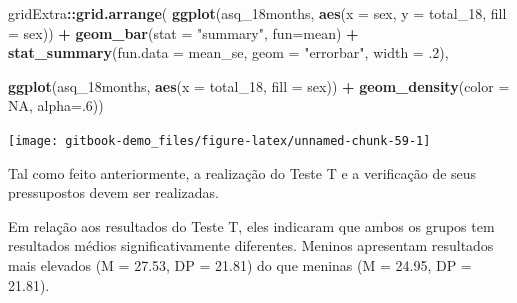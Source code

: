 \documentclass[
]{book}
\newenvironment{Shaded}{\begin{snugshade}}{\end{snugshade}}
\newcommand{\DataTypeTok}[1]{\textcolor[rgb]{0.13,0.29,0.53}{#1}}
\newcommand{\DecValTok}[1]{\textcolor[rgb]{0.00,0.00,0.81}{#1}}
\newcommand{\FloatTok}[1]{\textcolor[rgb]{0.00,0.00,0.81}{#1}}
\newcommand{\KeywordTok}[1]{\textcolor[rgb]{0.13,0.29,0.53}{\textbf{#1}}}
\newcommand{\NormalTok}[1]{#1}
\newcommand{\OperatorTok}[1]{\textcolor[rgb]{0.81,0.36,0.00}{\textbf{#1}}}
\newcommand{\OtherTok}[1]{\textcolor[rgb]{0.56,0.35,0.01}{#1}}
\newcommand{\StringTok}[1]{\textcolor[rgb]{0.31,0.60,0.02}{#1}}
\begin{document}
\begin{Shaded}
\begin{Highlighting}[]
\NormalTok{gridExtra}\OperatorTok{::}\KeywordTok{grid.arrange}\NormalTok{(}
  \KeywordTok{ggplot}\NormalTok{(asq_18months, }\KeywordTok{aes}\NormalTok{(}\DataTypeTok{x =}\NormalTok{ sex, }\DataTypeTok{y =}\NormalTok{ total_}\DecValTok{18}\NormalTok{, }\DataTypeTok{fill =}\NormalTok{ sex)) }\OperatorTok{+}
\StringTok{  }\KeywordTok{geom_bar}\NormalTok{(}\DataTypeTok{stat =} \StringTok{"summary"}\NormalTok{, }\DataTypeTok{fun=}\NormalTok{mean) }\OperatorTok{+}
\StringTok{  }\KeywordTok{stat_summary}\NormalTok{(}\DataTypeTok{fun.data =}\NormalTok{ mean_se, }\DataTypeTok{geom =} \StringTok{"errorbar"}\NormalTok{, }\DataTypeTok{width =} \FloatTok{.2}\NormalTok{),}

  \KeywordTok{ggplot}\NormalTok{(asq_18months, }\KeywordTok{aes}\NormalTok{(}\DataTypeTok{x =}\NormalTok{ total_}\DecValTok{18}\NormalTok{, }\DataTypeTok{fill =}\NormalTok{ sex)) }\OperatorTok{+}\StringTok{ }
\StringTok{  }\KeywordTok{geom_density}\NormalTok{(}\DataTypeTok{color =} \OtherTok{NA}\NormalTok{, }\DataTypeTok{alpha=}\NormalTok{.}\DecValTok{6}\NormalTok{))}
\end{Highlighting}
\end{Shaded}

\begin{center}\texttt{[image: gitbook-demo\_files/figure-latex/unnamed-chunk-59-1]} \end{center}

Tal como feito anteriormente, a realização do Teste T e a verificação de seus pressupostos devem ser realizadas.

Em relação aos resultados do Teste T, eles indicaram que ambos os grupos tem resultados médios significativamente diferentes. Meninos apresentam resultados mais elevados (M = 27.53, DP = 21.81) do que meninas (M = 24.95, DP = 21.81).

\begin{Shaded}
\end{Shaded}
\end{document}
